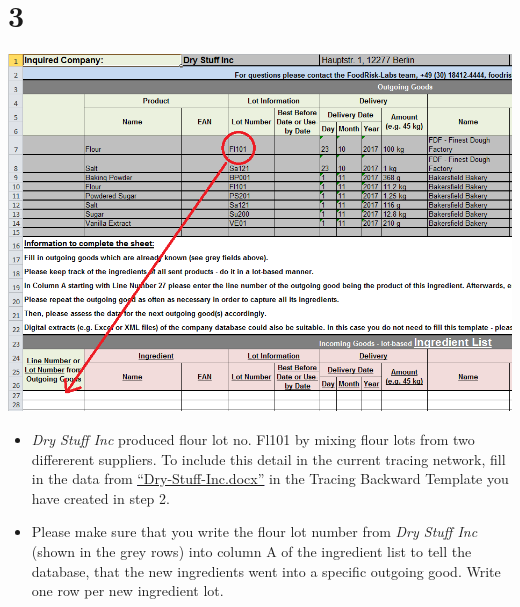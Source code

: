 \documentclass[10pt]{beamer}
\begin{document}
\section{3}
\begin{frame}
	\begin{center}
			\includegraphics[scale=0.3]{3.png}
	\end{center}
	\begin{itemize}
		\item \textit{Dry Stuff Inc} produced flour lot no. Fl101 by mixing flour lots from two differerent suppliers. To include this detail in the current tracing network, fill in the data from \textcolor{blue}{\underline{\href{https://github.com/SiLeBAT/BfROpenLabResources/raw/master/GitHubPages/documents/FCL\_Tracing\_backward\_template/Dry-Stuff-Inc.docx}{``Dry-Stuff-Inc.docx''}}} in the Tracing Backward Template you have created in step 2.
		\item Please make sure that you write the flour lot number from \textit{Dry Stuff Inc} (shown in the grey rows) into column A of the ingredient list to tell the database, that the new ingredients went into a specific outgoing good. Write one row per new ingredient lot.
	\end{itemize}
\end{frame}
\end{document}
